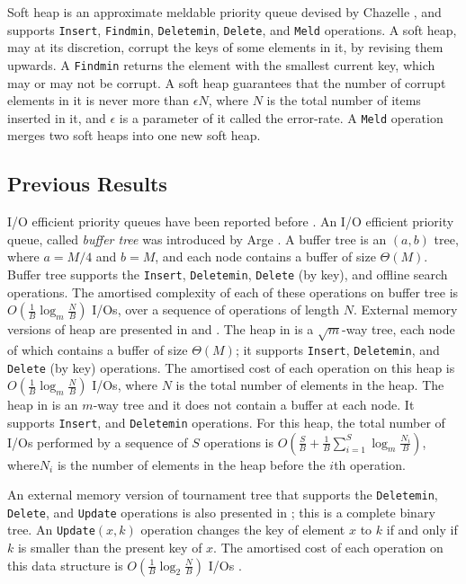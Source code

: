 Soft heap is an approximate meldable priority queue devised
	by Chazelle \cite{Ch00a}, and supports
	{\tt Insert}, {\tt Findmin}, {\tt Deletemin}, {\tt Delete}, and
	{\tt Meld} operations. 
A soft heap, may at its discretion, corrupt the keys of some elements in it, by revising them upwards.
A {\tt Findmin} returns the element with the smallest current key, which may or may not be corrupt. 
A soft heap guarantees that the number of corrupt elements in it is never more than
$\epsilon N$, where $N$ is the total number of items inserted in it, and $\epsilon$ is
a parameter of it called the error-rate.   
A {\tt Meld} operation merges two soft heaps into one new soft heap.

\subsection{Previous Results}
I/O efficient priority queues have been reported before \cite{Arge03,BK98,FJKT99,KS96,MZ03}.
An I/O efficient priority queue, called \emph{buffer tree}  was introduced by 
        Arge \cite{Arge03}.
A buffer tree is an $(a,b)$ tree, where $a = M/4$ and $b = M$, and each
        node contains a buffer of size $\Theta(M)$.
Buffer tree supports the {\tt Insert}, {\tt  Deletemin}, {\tt Delete} (by key), 
	and offline search operations.
The amortised complexity of each of these operations on buffer tree is
        $O(\frac{1}{B} \log_{m}\frac{N}{B})$
        I/Os, over a sequence of operations of length $N$.
External memory versions of heap are presented in \cite{KS96} and \cite{FJKT99}. 
The heap in \cite{KS96} is a $\sqrt{m}$-way tree, each node of which contains a buffer 
of size $\Theta(M)$; it supports {\tt Insert}, {\tt Deletemin}, and {\tt Delete} (by key) operations.
The amortised cost of each operation on this heap is
        $O(\frac{1}{B} \log_{m}\frac{N}{B})$
        I/Os, where $N$ is the total number of
        elements in the heap.
The heap in \cite{FJKT99} is an $m$-way tree and it does not contain a buffer at each node.
It supports {\tt Insert}, and {\tt Deletemin} operations.
For this heap, the total number of I/Os performed by a sequence of $S$
        operations is $O(\frac{S}{B}+\frac{1}{B}\sum_{i = 1}^{S} \log_{m}\frac{N_i}{B})$, where$N_i$ is the number
        of elements in the heap before the $i$th operation.

An external memory version of tournament tree that supports 
        the {\tt Deletemin}, {\tt Delete}, and {\tt Update}
        operations is also presented in \cite{KS96};
this is a complete binary tree.
An {\tt Update}$(x,k)$ operation changes the key of element $x$ to $k$
        if and only if $k$ is smaller than the present key of $x$.
The amortised cost of each operation on this data structure is $O(\frac{1}{B} \log_2 \frac{N}{B})$ I/Os \cite{KS96}.

